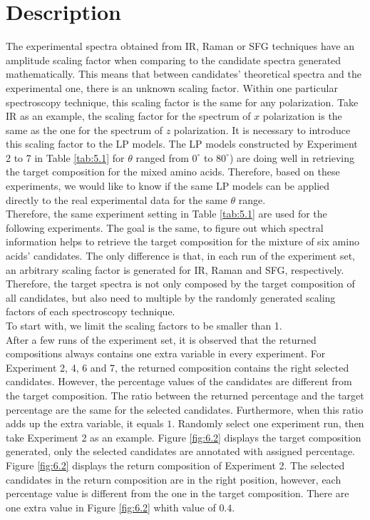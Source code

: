  \label{ch:6}
\section{Description}
The experimental spectra obtained from IR, Raman or SFG techniques have an amplitude scaling factor when comparing to the candidate spectra generated mathematically. This means that between candidates' theoretical spectra and the experimental one, there is an unknown scaling factor. Within one particular spectroscopy technique, this scaling factor is the same for any polarization. Take IR as an example, the scaling factor for the spectrum of $x$ polarization is the same as the one for the spectrum of $z$ polarization. It is necessary to introduce this scaling factor to the LP models. The LP models constructed by Experiment 2 to 7 in Table \ref{tab:5.1} for $\theta$ ranged from $0^{\circ}$ to $80^{\circ}$) are doing well in retrieving the target composition for the mixed amino acids. Therefore, based on these experiments, we would like to know if the same LP models can be applied directly to the real experimental data for the same $\theta$ range.\\

Therefore, the same experiment setting in Table \ref{tab:5.1} are used for the following experiments. The goal is the same, to figure out which spectral information helps to retrieve the target composition for the mixture of six amino acids' candidates. The only difference is that, in each run of the experiment set, an arbitrary scaling factor is generated for IR, Raman and SFG, respectively. Therefore, the target spectra is not only composed by the target composition of all candidates, but also need to multiple by the randomly generated scaling factors of each spectroscopy technique. \\

To start with, we limit the scaling factors to be smaller than 1. \\

After a few runs of the experiment set, it is observed that the returned compositions always contains one extra variable in every experiment. For Experiment 2, 4, 6 and 7, the returned composition contains the right selected candidates. However, the percentage values of the candidates are different from the target composition. The ratio between the returned percentage and the target percentage are the same for the selected candidates. Furthermore, when this ratio adds up the extra variable, it equals $1$. Randomly select one experiment run, then take Experiment 2 as an example. Figure \ref{fig:6.2} displays the target composition generated, only the selected candidates are annotated with assigned percentage. Figure \ref{fig:6.2} displays the return composition of Experiment 2. The selected candidates in the return composition are in the right position, however, each percentage value is different from the one in the target composition. There are one extra value in Figure \ref{fig:6.2} whith value of $0.4$. \\

